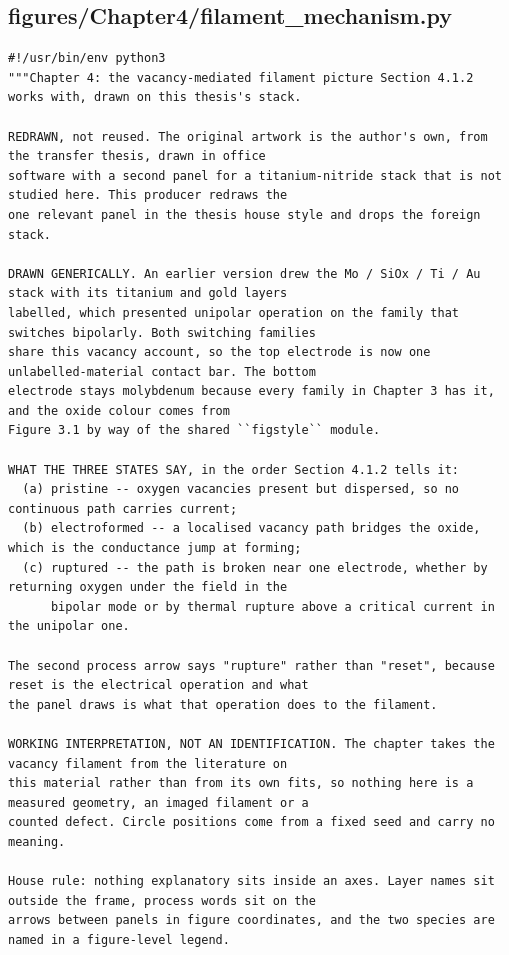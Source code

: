 \documentclass[a4paper,10pt]{article}
\begin{document}
\subsection{figures/Chapter4/filament\_mechanism.py}
\begin{Verbatim}
#!/usr/bin/env python3
"""Chapter 4: the vacancy-mediated filament picture Section 4.1.2 works with, drawn on this thesis's stack.

REDRAWN, not reused. The original artwork is the author's own, from the transfer thesis, drawn in office
software with a second panel for a titanium-nitride stack that is not studied here. This producer redraws the
one relevant panel in the thesis house style and drops the foreign stack.

DRAWN GENERICALLY. An earlier version drew the Mo / SiOx / Ti / Au stack with its titanium and gold layers
labelled, which presented unipolar operation on the family that switches bipolarly. Both switching families
share this vacancy account, so the top electrode is now one unlabelled-material contact bar. The bottom
electrode stays molybdenum because every family in Chapter 3 has it, and the oxide colour comes from
Figure 3.1 by way of the shared ``figstyle`` module.

WHAT THE THREE STATES SAY, in the order Section 4.1.2 tells it:
  (a) pristine -- oxygen vacancies present but dispersed, so no continuous path carries current;
  (b) electroformed -- a localised vacancy path bridges the oxide, which is the conductance jump at forming;
  (c) ruptured -- the path is broken near one electrode, whether by returning oxygen under the field in the
      bipolar mode or by thermal rupture above a critical current in the unipolar one.

The second process arrow says "rupture" rather than "reset", because reset is the electrical operation and what
the panel draws is what that operation does to the filament.

WORKING INTERPRETATION, NOT AN IDENTIFICATION. The chapter takes the vacancy filament from the literature on
this material rather than from its own fits, so nothing here is a measured geometry, an imaged filament or a
counted defect. Circle positions come from a fixed seed and carry no meaning.

House rule: nothing explanatory sits inside an axes. Layer names sit outside the frame, process words sit on the
arrows between panels in figure coordinates, and the two species are named in a figure-level legend.


\end{Verbatim}
\end{document}
